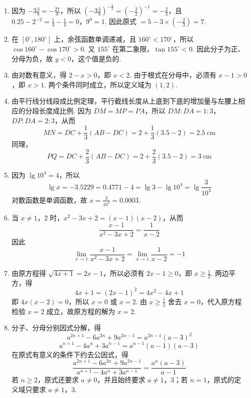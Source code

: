 \begin{solution}
\begin{enumerate}
    \item 因为 \(-3\frac{3}{8}=-\frac{27}{8}\)，所以 \(\left(-3\frac{3}{8}\right)^{-\frac{1}{3}}=\left(-\frac{3}{2}\right)^{-1}=-\frac{2}{3}\)，且 \(0.25-2^{-2}=\frac{1}{4}-\frac{1}{4}=0\)，\(9^0=1\). 因此原式 \(=5-3\times\left(-\frac{2}{3}\right)=7\).

    \item 在 \([0^\circ,180^\circ]\) 上，余弦函数单调递减，且 \(160^\circ<170^\circ\)，所以 \(\cos160^\circ-\cos170^\circ>0\). 又 \(155^\circ\) 在第二象限，\(\tan155^\circ<0\). 因此分子为正、分母为负，故 \(y<0\)，这个值是负的.

    \item 由对数有意义，得 \(2-x>0\)，即 \(x<2\). 由于根式在分母中，必须有 \(x-1>0\)，即 \(x>1\). 两个条件同时成立，所以定义域为 \(\left(1,2\right)\).

    \item 由平行线分线段成比例定理，平行截线长度从上底到下底的增加量与左腰上相应的分段长度成比例. 因为 \(DM=MP=PA\)，所以 \(DM:DA=1:3\)，\(DP:DA=2:3\)，从而
    \[
    MN=DC+\frac{1}{3}\left(AB-DC\right)=2+\frac{1}{3}\left(3.5-2\right)=2.5\mathrm{~cm}
    \]
    同理，
    \[
    PQ=DC+\frac{2}{3}\left(AB-DC\right)=2+\frac{2}{3}\left(3.5-2\right)=3\mathrm{~cm}
    \]

    \item 因为 \(\lg10^4=4\)，所以
    \[
    \lg x=-3.5229=0.4771-4=\lg3-\lg10^4=\lg\frac{3}{10^4}
    \]
    对数函数是单调函数，故 \(x=\frac{3}{10^4}=0.0003\).

    \item 当 \(x\ne1\)，\(2\) 时，\(x^2-3x+2=(x-1)(x-2)\)，从而
    \[
    \frac{x-1}{x^2-3x+2}=\frac{1}{x-2}
    \]
    因此
    \[
    \displaystyle\lim_{x\to1}\frac{x-1}{x^2-3x+2}=\lim_{x\to1}\frac{1}{x-2}=-1
    \]

    \item 由原方程得 \(\sqrt{4x+1}=2x-1\)，所以必须有 \(2x-1\geqslant0\)，即 \(x\geqslant\frac{1}{2}\). 两边平方，得
    \[
    4x+1=(2x-1)^2=4x^2-4x+1
    \]
    即 \(4x(x-2)=0\)，所以 \(x=0\) 或 \(x=2\). 由 \(x\geqslant\frac{1}{2}\) 舍去 \(x=0\)，代入原方程检验 \(x=2\) 成立，故原方程的解为 \(x=2\).

    \item 分子、分母分别因式分解，得
    \[
    a^{2n+1}-6a^{2n}+9a^{2n-1}=a^{2n-1}(a-3)^2
    \]
    \[
    a^{n+1}-4a^n+3a^{n-1}=a^{n-1}(a-1)(a-3)
    \]
    在原式有意义的条件下约去公因式，得
    \[
    \frac{a^{2n+1}-6a^{2n}+9a^{2n-1}}{a^{n+1}-4a^n+3a^{n-1}}=\frac{a^n(a-3)}{a-1}
    \]
    若 \(n\geqslant2\)，原式还要求 \(a\ne0\)，并且始终要求 \(a\ne1\)，\(3\)；若 \(n=1\)，原式的定义域只要求 \(a\ne1\)，\(3\).


\end{enumerate}
\end{solution}
